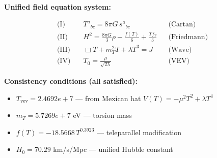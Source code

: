 
\textbf{Unified field equation system:}

\begin{align}
  \text{(I)} \quad & T^a{}_{bc} = 8\pi G \, s^a{}_{bc} && \text{(Cartan)} \\
  \text{(II)} \quad & H^2 = \frac{8\pi G}{3}\rho - \frac{f(T)}{6} + \frac{Tf_T}{3} && \text{(Friedmann)} \\
  \text{(III)} \quad & \Box T + m_T^2 T + \lambda T^3 = J && \text{(Wave)} \\
  \text{(IV)} \quad & T_0 = \frac{\mu}{\sqrt{2\lambda}} && \text{(VEV)}
\end{align}

\textbf{Consistency conditions (all satisfied):}
\begin{itemize}
  \item $T_{\text{vev}} = 2.4692e+7$ — from Mexican hat $V(T) = -\mu^2 T^2 + \lambda T^4$
  \item $m_T = 5.7269e+7$ eV — torsion mass
  \item $f(T) = -18.5668 \, T^{0.3923}$ — teleparallel modification
  \item $H_0 = 70.29$ km/s/Mpc — unified Hubble constant
\end{itemize}